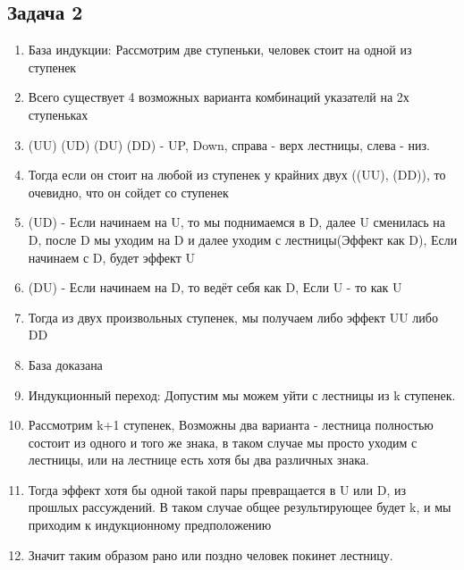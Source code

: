 \documentclass[a4paper,12pt]{article}
\begin{document}
\subsection{Задача 2}
\begin{enumerate}
    \item База индукции: Рассмотрим две ступеньки, человек стоит на одной из ступенек
    \item Всего существует 4 возможных варианта комбинаций указателй на 2х ступеньках
    \item (UU) (UD) (DU) (DD) - UP, Down, справа - верх лестницы, слева - низ.
    \item Тогда если он стоит на любой из ступенек у крайних двух ((UU), (DD)), то очевидно, что он сойдет со ступенек
    \item (UD) - Если начинаем на U, то мы поднимаемся в D, далее U сменилась на D, после D мы уходим на D и далее уходим с лестницы(Эффект как D), Если начинаем с D, будет эффект U
    \item (DU) - Если начинаем на D, то ведёт себя как D, Если U - то как U
    \item Тогда из двух произвольных ступенек, мы получаем либо эффект UU либо DD
    \item База доказана
    \item Индукционный переход: Допустим мы можем уйти с лестницы из k ступенек.
    \item Рассмотрим k+1 ступенек, Возможны два варианта - лестница полностью состоит из одного и того же знака, в таком случае мы просто уходим с лестницы, или на лестнице есть хотя бы два различных знака.
    \item Тогда эффект хотя бы одной такой пары превращается в U или D, из прошлых рассуждений. В таком случае общее результирующее будет k, и мы приходим к индукционному предположению
    \item Значит таким образом  рано или поздно человек покинет лестницу.
\end{enumerate}
\end{document}
